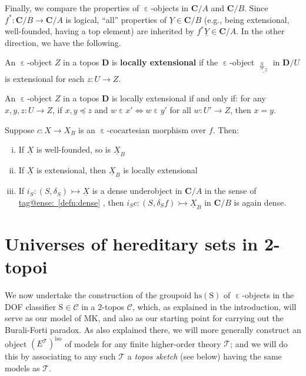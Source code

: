 \documentclass{amsart}
\makeatletter
\newcommand\bC{\mathbf{C}}
\newcommand\bD{\mathbf{D}}
\newcommand\cC{\mathcal{C}}
\newcommand\cT{\mathcal{T}}
\newcommand\defword[1]{{\boldmath \textbf{#1}}}
\newcommand\Dwn{{\Downarrow}}
\newcommand\ein{\mathrel{\varepsilon}}
\newcommand\hs{\mathrm{hs}}
\newcommand\iso{\mathrm{iso}}
\newcommand\rS{\mathrm{S}}
\newcommand\ToT{\Leftrightarrow}
\newcommand\tto{\rightarrowtail}
\newcommand\und[1]{\underline{#1}}
\newcommand\unein{{\ein}}
\newcommand\prooflabel[1]{\gdef\proof@label{#1}}
\def\proof@label{}
\newcommand\tagword[1]{\csname tag@#1\endcsname}
\def\label@tag#1:#2\@nil{#1}
\newcommand\labeltag[1]{\label@tag#1:\@nil}
\newcommand\jref[1]{%
  \texorpdfstring%
    {\hyperref[#1]{\tagword{\labeltag{#1}}~\ref*{#1}}}%
    {\tagword{\labeltag{#1}}~\ref*{#1}}%
}
\theoremstyle{definition}
\theoremstyle{remark}
\theoremstyle{plainwithref}
\makeatother
\begin{document}
Finally, we compare the properties of \( \unein \)-objects in \( \bC / A \) and \( \bC / B \).
Since \( f^* \colon \bC / B \to \bC / A \) is logical, ``all'' properties of \( \und Y \in \bC / B \) (e.g., being extensional, well-founded, having a top element) are inherited by \( f^* \und Y \in \bC / A \).
In the other direction, we have the following.

\begin{defn} \label{defn:loc-ext}
  An \( \unein \)-object \( Z \) in a topos \( \bD \) is \defword{locally extensional} if the \( \unein \)-object \( \und{\Dwn_z} \) in \( \bD / U \) is extensional for each \( z \colon U \to Z \).
\end{defn}

\prooflabel{proof:loc-ext-char}
\begin{lem} \label{lem:loc-ext-char}
  An \( \unein \)-object \( Z \) in a topos \( \bD \) is locally extensional if and only if: for any \( x,y,z \colon U \to Z \), if \( x, y \preceq z \) and \( w \ein x' \ToT w \ein y' \) for all \( w \colon U' \to Z \), then \( x = y \).
\end{lem}

\prooflabel{proof:sum-props}
\begin{propn} \label{propn:sum-props}
  Suppose \( c \colon X \to X_B \) is an \( \unein \)-cocartesian morphism over \( f \).
  Then:
  \begin{enumerate}[(i)]
  \item If \( \und X \) is well-founded, so is \( \und X_B \)
  \item If \( \und X \) is extensional, then \( \und X_B \) is locally extensional
  \item If \( i_S \colon (S, \delta_S) \tto \und X \) is a dense underobject in \( \bC / A \) in the sense of \jref{defn:dense}, then \( i_S c \colon (S, \delta_S f) \tto \und X_B \) in \( \bC / B \) is again dense.
  \end{enumerate}
\end{propn}

\section{Universes of hereditary sets in 2-topoi} \label{sec:univs-in-2-topoi}
We now undertake the construction of the groupoid \( \hs(\rS) \) of \( \ein \)-objects in the DOF classifier \( \rS \in \cC \) in a 2-topos \( \cC \), which, as explained in the introduction, will serve as our model of MK, and also as our starting point for carrying out the Burali-Forti paradox.
As also explained there, we will more generally construct an object \( (E^\cT)^\iso \) of models for any finite higher-order theory \( \cT \); and we will do this by associating to any such \( \cT \) a \emph{topos sketch} (see below) having the same models as \( \cT \).
\end{document}
